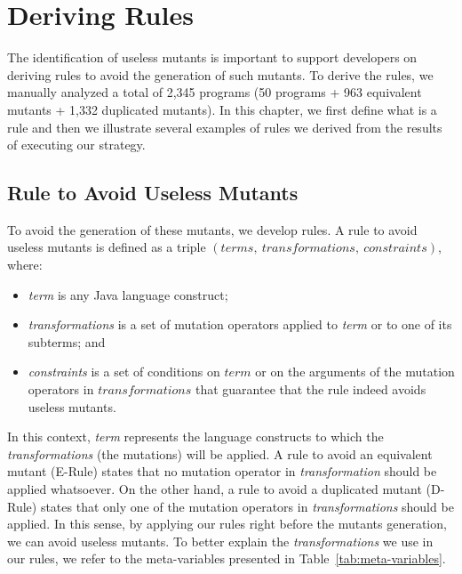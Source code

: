 \chapter{Deriving Rules}
\label{sec:rules}

The identification of useless mutants is important to support developers on deriving rules to avoid the generation of such mutants. 
To derive the rules, we manually analyzed a total of 2,345 programs (50 programs + 963 equivalent mutants + 1,332 duplicated mutants). 
In this chapter, we first define what is a rule and then we illustrate several examples of rules we derived from the results of executing our strategy.


\section{Rule to Avoid Useless Mutants}
\label{sec:rules-definition}

To avoid the generation of these mutants, we develop rules.
A rule to avoid useless mutants is defined as a triple $(terms,~ transformations,~constraints)$, where:

\begin{itemize}
	
	\item \textit{term} is any Java language construct;
	
	\item \textit{transformations} is a set of mutation operators applied to \textit{term} or to one of its subterms; and
	
	\item \textit{constraints} is a set of conditions on $term$ or on the arguments of the mutation operators in $transformations$ that guarantee that the rule indeed avoids useless mutants.
	
\end{itemize}


In this context, \textit{term} represents the language constructs to which the \textit{transformations} (the mutations) will be applied. 
A rule to avoid an equivalent mutant (E-Rule) states that no mutation operator in \textit{transformation} should be applied whatsoever. 
On the other hand, a rule to avoid a duplicated mutant (D-Rule) states that only one of the mutation operators in \textit{transformations} should be applied. 
In this sense, by applying our rules right before the mutants generation, we can avoid useless mutants. 
To better explain the \textit{transformations} we use in our rules, we refer to the meta-variables presented in Table~\ref{tab:meta-variables}.

